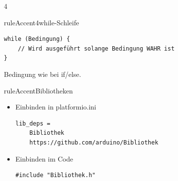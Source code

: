 \documentclass[a4paper,10pt,landscape]{article}
\begin{document}
\begin{multicols}{4}
\begin{regelbox}{ruleAccent4}{\faSync\enspace while-Schleife}
\begin{lstlisting}
while (Bedingung) {
	// Wird ausgeführt solange Bedingung WAHR ist
}
\end{lstlisting}
Bedingung wie bei if/else.
\end{regelbox}

\begin{regelbox}{ruleAccent}{\faArchive\enspace Bibliotheken}
\begin{itemize}
\item Einbinden in platformio.ini
\begin{lstlisting}
lib_deps =
	Bibliothek
	https://github.com/arduino/Bibliothek
\end{lstlisting}
\item Einbinden im Code
\begin{lstlisting}
#include "Bibliothek.h"
\end{lstlisting}
\end{itemize}
\end{regelbox}

\end{multicols}
\end{document}
